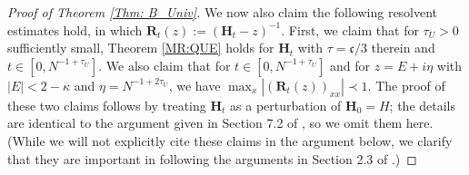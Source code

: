 \begin{proof}[Proof of Theorem \ref{Thm: B_Univ}]
\bigskip

We now also claim the following resolvent estimates hold, in which $\mathbf{R}_{t}(z):=(\mathbf{H}_{t}-z)^{-1}$. First, we claim that for $\tau_{U}>0$ sufficiently small, Theorem \ref{MR:QUE} holds for $\mathbf{H}_{t}$ with $\tau=\mathfrak{c}/3$ therein and $t\in[0,N^{-1+\tau_{U}}]$. We also claim that for $t\in[0,N^{-1+\tau_{U}}]$ and for $z=E+i\eta$ with $|E|<2-\kappa$ and $\eta=N^{-1+2\tau_{U}}$, we have $\max_{x}|(\mathbf{R}_{t}(z))_{xx}|\prec1$. The proof of these two claims follows by treating $\mathbf{H}_{t}$ as a perturbation of $\mathbf{H}_{0}=H$; the details are identical to the argument given in Section 7.2 of \cite{YY_25}, so we omit them here. (While we will not explicitly cite these claims in the argument below, we clarify that they are important in following the arguments in Section 2.3 of \cite{YY_25}.)


\end{proof}
